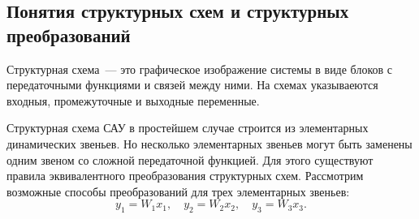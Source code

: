 \subsection{Понятия структурных схем и структурных преобразований}
Структурная схема~--- это графическое изображение системы в виде блоков с передаточными функциями и связей между ними. На схемах указываеются входныя, промежуточные и выходные переменные.

Структурная схема САУ в простейшем случае строится из элементарных динамических звеньев. Но несколько элементарных звеньев могут быть заменены одним звеном со сложной передаточной функцией. Для этого существуют правила эквивалентного преобразования структурных схем. Рассмотрим возможные способы преобразований для трех элементарных звеньев:
\begin{equation}
    y_1 = W_1 x_1, \quad y_2 = W_2 x_2, \quad y_3 = W_3 x_3.
\end{equation}
